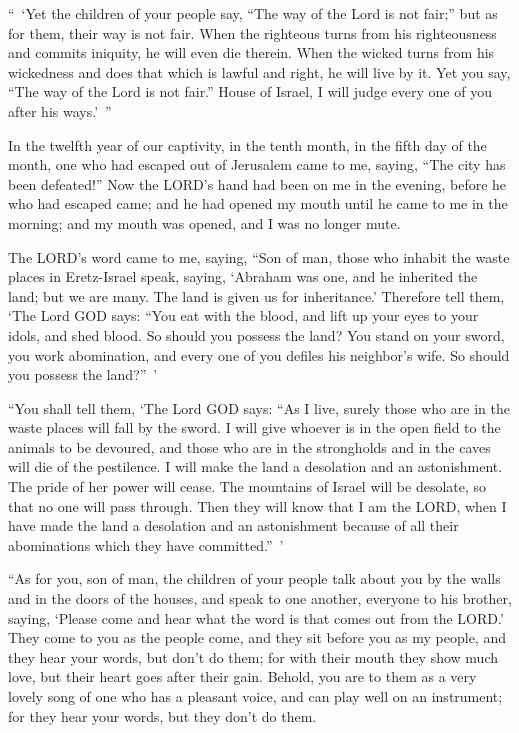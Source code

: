 \myverse{}“ ‘Yet the children of your people say, “The way of the Lord
is not fair;” but as for them, their way is not fair.
\myverse{}When the righteous turns from his righteousness and commits iniquity, he
will even die therein.
\myverse{}When the wicked turns from his wickedness and does that which is lawful and
right, he will live by it.
\myverse{}Yet you say, “The way of the Lord is not fair.” House of Israel, I will judge
every one of you after his ways.’ ”


\vspace{\baselineskip} \myverse{}In the twelfth year of our captivity, in the tenth month, in
the fifth day of the month, one who had escaped out of Jerusalem came to me, saying, “The city has been
defeated!”
\myverse{}Now the LORD’s hand had been on me in the evening, before he who had escaped
came; and he had opened my mouth until he came to me in the morning; and my mouth was opened, and I was
no longer mute.

\myverse{}The LORD’s word came to me, saying,
\myverse{}“Son of man, those who inhabit the waste places in Eretz-Israel speak, saying,
‘Abraham was one, and he inherited the land; but we are many. The land is given us for inheritance.’
\myverse{}Therefore tell them, ‘The Lord GOD says: “You eat with the blood, and lift
up your eyes to your idols, and shed blood. So should you possess the land?
\myverse{}You stand on your sword, you work abomination, and every one of you defiles
his neighbor’s wife. So should you possess the land?” ’

\myverse{}“You shall tell them, ‘The Lord GOD says: “As I live, surely
those who are in the waste places will fall by the sword. I will give whoever is in the open field to
the animals to be devoured, and those who are in the strongholds and in the caves will die of the pestilence.
\myverse{}I will make the land a desolation and an astonishment. The pride of her power
will cease. The mountains of Israel will be desolate, so that no one will pass through.
\myverse{}Then they will know that I am the LORD, when I have made the land a desolation
and an astonishment because of all their abominations which they have committed.” ’

\myverse{}“As for you, son of man, the children of your people talk about
you by the walls and in the doors of the houses, and speak to one another, everyone to his brother, saying,
‘Please come and hear what the word is that comes out from the LORD.’
\myverse{}They come to you as the people come, and they sit before you as my people,
and they hear your words, but don’t do them; for with their mouth they show much love, but their heart
goes after their gain.
\myverse{}Behold, you are to them as a very lovely song of one who has a pleasant voice,
and can play well on an instrument; for they hear your words, but they don’t do them.

